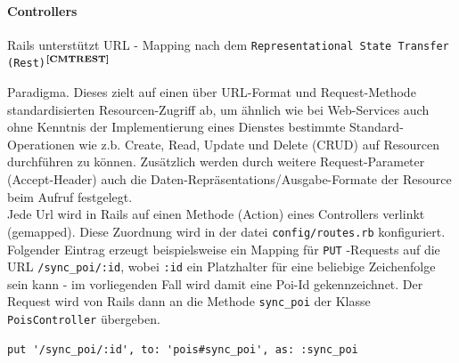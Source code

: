 \paragraph{Controllers}\noindent
Rails unterstützt URL - Mapping nach dem \texttt{Representational State Transfer (Rest)}$^{\textbf{\ref{CMTREST}}}$%
\addtocounter{footnote}{1}%
 Paradigma. Dieses zielt auf einen über URL-Format und Request-Methode standardisierten Resourcen-Zugriff ab, um ähnlich wie bei Web-Services auch ohne Kenntnis der Implementierung eines Dienstes bestimmte Standard-Operationen wie z.b. Create, Read, Update und Delete (CRUD) auf Resourcen durchführen zu können. Zusätzlich werden durch weitere Request-Parameter (Accept-Header) auch die Daten-Repräsentations/Ausgabe-Formate der Resource beim Aufruf festgelegt.\\
Jede Url wird in Rails auf einen Methode (Action) eines Controllers verlinkt (gemapped). Diese Zuordnung
wird in der datei \texttt{config/routes.rb} konfiguriert.\\
Folgender Eintrag erzeugt beispielsweise ein Mapping für 
\texttt{PUT} -Requests auf die URL \texttt{/sync\_poi/:id}, wobei \texttt{:id} ein Platzhalter für eine beliebige Zeichenfolge sein kann - im vorliegenden Fall wird damit eine Poi-Id gekennzeichnet. Der Request wird von Rails dann an die Methode \texttt{sync\_poi} der Klasse \texttt{PoisController} übergeben.\\
\begin{lstlisting}[frame=single,xleftmargin=0pt,numbers=none,caption={Konfiguration eines URL-Mappings in conf/routes.rb},captionpos=b]
  put '/sync_poi/:id', to: 'pois#sync_poi', as: :sync_poi
\end{lstlisting}

